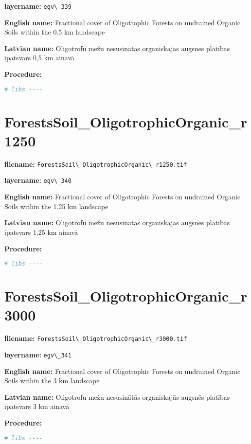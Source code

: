 \documentclass[
]{book}
\newcommand{\passthrough}[1]{#1}
\begin{document}
\textbf{layername:} \passthrough{\lstinline!egv\_339!}

\textbf{English name:} Fractional cover of Oligotrophic Forests on undrained Organic Soils within the 0.5 km landscape

\textbf{Latvian name:} Oligotrofu mežu nesusinātās organiskajās augsnēs platības īpatsvars 0,5 km ainavā

\textbf{Procedure:}

\begin{lstlisting}[language=R]
# libs ----
\end{lstlisting}

\section{ForestsSoil\_OligotrophicOrganic\_r1250}\label{ch06.340}

\textbf{filename:} \passthrough{\lstinline!ForestsSoil\_OligotrophicOrganic\_r1250.tif!}

\textbf{layername:} \passthrough{\lstinline!egv\_340!}

\textbf{English name:} Fractional cover of Oligotrophic Forests on undrained Organic Soils within the 1.25 km landscape

\textbf{Latvian name:} Oligotrofu mežu nesusinātās organiskajās augsnēs platības īpatsvars 1,25 km ainavā

\textbf{Procedure:}

\begin{lstlisting}[language=R]
# libs ----
\end{lstlisting}

\section{ForestsSoil\_OligotrophicOrganic\_r3000}\label{ch06.341}

\textbf{filename:} \passthrough{\lstinline!ForestsSoil\_OligotrophicOrganic\_r3000.tif!}

\textbf{layername:} \passthrough{\lstinline!egv\_341!}

\textbf{English name:} Fractional cover of Oligotrophic Forests on undrained Organic Soils within the 3 km landscape

\textbf{Latvian name:} Oligotrofu mežu nesusinātās organiskajās augsnēs platības īpatsvars 3 km ainavā

\textbf{Procedure:}

\begin{lstlisting}[language=R]
# libs ----
\end{lstlisting}
\end{document}

